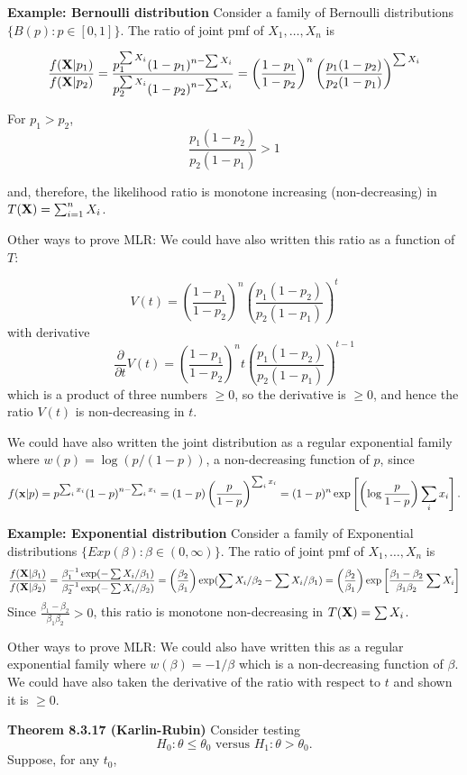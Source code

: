 \documentclass[11pt,]{article}
\def\bx{{\bf x}}
\def\bX{{\bf X}}
\def\sumin{\sum_{i=1}^n}
\begin{document}
\textbf{Example: Bernoulli distribution} Consider a family of Bernoulli
distributions \(\{B(p): p \in [0,1]\}\). The ratio of joint pmf of
\(X_1, \ldots, X_n\) is

\[\frac{f(\bX| p_1)}{f(\bX | p_2)} = \frac{p_1^{\sum X_i} (1-p_1)^{n-\sum X_i}}{p_2^{\sum X_i}(1-p_2)^{n-\sum X_i}} = 
\left( \frac{1-p_1}{1-p_2}\right)^n \left( \frac{p_1(1-p_2)}{p_2(1-p_1)}\right)^{\sum X_i} \]

For \(p_1 > p_2\), \[\frac{p_1(1-p_2)}{p_2(1-p_1)} > 1\]

and, therefore, the likelihood ratio is monotone increasing
(non-decreasing) in \(T(\bX) = \sumin X_i\).

Other ways to prove MLR: We could have also written this ratio as a
function of \(T\):

\[V(t) = \left( \frac{1-p_1}{1-p_2}\right)^n \left( \frac{p_1(1-p_2)}{p_2(1-p_1)}\right)^{t} \]
with derivative
\[\frac{\partial}{\partial t}V(t) =  \left( \frac{1-p_1}{1-p_2}\right)^n t \left( \frac{p_1(1-p_2)}{p_2(1-p_1)}\right)^{t-1} \]
which is a product of three numbers \(\geq0\), so the derivative is
\(\geq 0\), and hence the ratio \(V(t)\) is non-decreasing in \(t\).

We could have also written the joint distribution as a regular
exponential family where \(w(p) = \log(p/(1-p))\), a non-decreasing
function of \(p\), since
\[f(\bx|p) = p^{\sum_i x_i} (1-p)^{n-\sum_i x_i} = (1-p) \left( \frac{p}{1-p}\right)^{\sum_i x_i} = (1-p)^n \exp\left[ \left(\log \frac{p}{1-p}\right)\sum_i x_i\right].\]

\textbf{Example: Exponential distribution} Consider a family of
Exponential distributions \(\{Exp(\beta): \beta \in (0,\infty)\}\). The
ratio of joint pmf of \(X_1, \ldots, X_n\) is
\[\frac{f(\bX| \beta_1)}{f(\bX | \beta_2)} = \frac{\beta_1^{-1}\exp(-\sum X_i/\beta_1)}{\beta_2^{-1}\exp(-\sum X_i/\beta_2)} =
\left(\frac{\beta_2}{\beta_1}\right)\exp(\sum X_i / \beta_2 - \sum X_i/\beta_1) = 
\left(\frac{\beta_2}{\beta_1}\right) \exp \left[\frac{\beta_1 - \beta_2}{\beta_1\beta_2}\sum X_i \right]
\] Since \(\frac{\beta_1 - \beta_2}{\beta_1\beta_2} > 0\), this ratio is
monotone non-decreasing in \(T(\bX) = \sum X_i\).

Other ways to prove MLR: We could also have written this as a regular
exponential family where \(w(\beta) = -1/\beta\) which is a
non-decreasing function of \(\beta\). We could have also taken the
derivative of the ratio with respect to \(t\) and shown it is
\(\geq 0\).

\textbf{Theorem 8.3.17 (Karlin-Rubin)} Consider testing
\[H_0: \theta \leq \theta_0 \mbox{ versus } H_1: \theta > \theta_0.\]
Suppose, for any \(t_0\),
\end{document}
